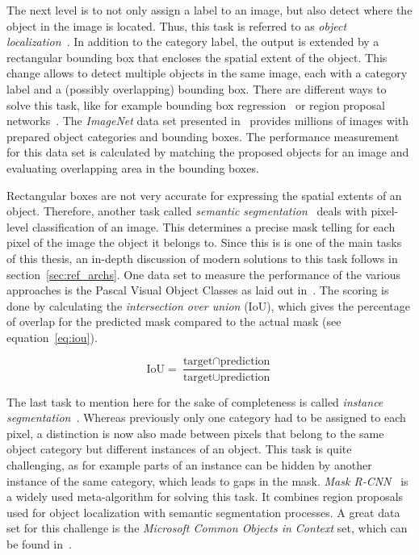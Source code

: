 The next level is to not only assign a label to an image, but also detect where the object in the image is located. Thus, this task is referred to as \emph{object localization}~\cite{rcnn14}. In addition to the category label, the output is extended by a rectangular bounding box that encloses the spatial extent of the object. This change allows to detect multiple objects in the same image, each with a category label and a (possibly overlapping) bounding box. There are different ways to solve this task, like for example bounding box regression~\cite{obj_detection13} or region proposal networks~\cite{ff-rcnn14}. The \emph{ImageNet} data set presented in~\cite{imgnet09} provides millions of images with prepared object categories and bounding boxes. The performance measurement for this data set is calculated by matching the proposed objects for an image and evaluating overlapping area in the bounding boxes.

Rectangular boxes are not very accurate for expressing the spatial extents of an object. Therefore, another task called \emph{semantic segmentation}~\cite{weakseg15} deals with pixel-level classification of an image. This determines a precise mask telling for each pixel of the image the object it belongs to. Since this is is one of the main tasks of this thesis, an in-depth discussion of modern solutions to this task follows in section~\ref{sec:ref_archs}. One data set to measure the performance of the various approaches is the Pascal Visual Object Classes as laid out in~\cite{pascal_voc15}. The scoring is done by calculating the \emph{intersection over union} (IoU), which gives the percentage of overlap for the predicted mask compared to the actual mask (see equation~\ref{eq:iou}).

\begin{equation}
    \label{eq:iou}
    \text{IoU} = \frac{\text{target} \cap \text{prediction}}{\text{target} \cup \text{prediction}}
\end{equation}

The last task to mention here for the sake of completeness is called \emph{instance segmentation}~\cite{mask-rcnn14}. Whereas previously only one category had to be assigned to each pixel, a distinction is now also made between pixels that belong to the same object category but different instances of an object. This task is quite challenging, as for example parts of an instance can be hidden by another instance of the same category, which leads to gaps in the mask. \emph{Mask R-CNN}~\cite{mask-rcnn14} is a widely used meta-algorithm for solving this task. It combines region proposals used for object localization with semantic segmentation processes. A great data set for this challenge is the \emph{Microsoft Common Objects in Context} set, which can be found in~\cite{coco15}.

